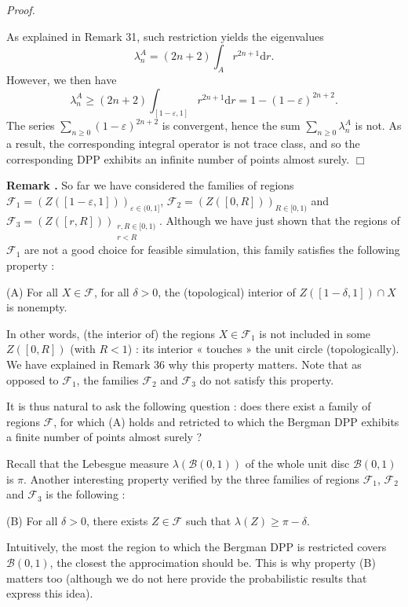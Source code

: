 \documentclass[11pt]{article}
\newcommand{\qed}{\hfill$\Box$}
\newcounter{cnt}
\newcommand{\cnt}{\thecnt \stepcounter{cnt}}
\begin{document}
\textit{Proof.} 

As explained in Remark 31, such restriction yields the eigenvalues
\[
\lambda_n^A = (2n+2)\int_A r^{2n+1} \mathrm d r .
\]
However, we then have 
\[
\lambda_n^A \ge (2n+2) \int_{[1-\varepsilon, 1]} r^{2n+1} \mathrm d r = 1 - (1-\varepsilon)^{2n+2}.
\]
The series $ \displaystyle \sum_{n\ge 0} (1-\varepsilon)^{2n+2} $ is convergent, hence the sum $ \displaystyle \sum_{n \ge 0} \lambda_n^A $ is not. As a result, the corresponding integral operator is not trace class, and so the corresponding DPP exhibits an infinite number of points almost surely. \qed

\textbf{Remark \cnt.} So far we have considered the families of regions $ \mathcal F_1 = (Z([1-\varepsilon, 1]))_{\varepsilon \in (0,1]} $, $ \mathcal F_2 = (Z([0,R]))_{R \in [0,1)} $ and $ \mathcal F_3 = (Z([r,R]))_{\substack{r,R \in [0,1) \\ r < R }} $. Although we have just shown that the regions of $ \mathcal F_1 $ are not a good choice for feasible simulation, this family satisfies the following property :

\begin{center} 
    (A) For all $ X \in \mathcal F$, for all $ \delta > 0 $, the (topological) interior of $Z([1-\delta, 1]) \cap X$ is nonempty.
\end{center}

In other words, (the interior of) the regions $X \in \mathcal F_1$ is not included in some $ Z([0,R]) $ (with $ R < 1 $) : its interior « touches » the unit circle (topologically). We have explained in Remark 36 why this property matters. Note that as opposed to $\mathcal F_1$, the families $\mathcal F_2$ and $\mathcal F_3$ do not satisfy this property.

It is thus natural to ask the following question : does there exist a family of regions $ \mathcal F $, for which (A) holds and retricted to which the Bergman DPP exhibits a finite number of points almost surely ?

Recall that the Lebesgue measure $ \lambda(\mathcal B(0,1)) $ of the whole unit disc $ \mathcal B(0,1)$ is $ \pi $. Another interesting property verified by the three families of regions $ \mathcal F_1 $, $ \mathcal F_2 $ and $ \mathcal F_3 $ is the following :

(B) For all $ \delta > 0 $, there exists $ Z \in \mathcal F $ such that $ \lambda (Z) \ge \pi - \delta $.

Intuitively, the most the region to which the Bergman DPP is restricted covers $ \mathcal B(0,1) $, the closest the approcimation should be. This is why property (B) matters too (although we do not here provide the probabilistic results that express this idea). 
\end{document}
